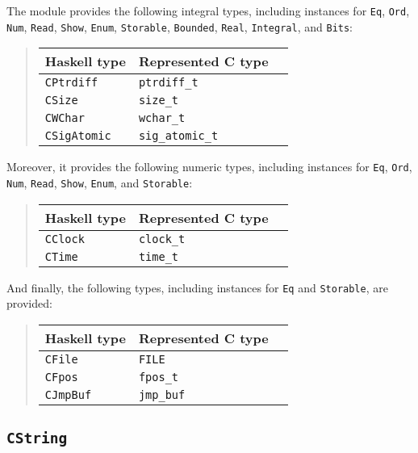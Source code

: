 \documentclass[a4paper,twoside]{article}
\newcommand{\code}[1]{\texttt{#1}}      %
\begin{document}
%
The module provides the following integral types, including instances for
\code{Eq}, \code{Ord}, \code{Num}, \code{Read}, \code{Show}, \code{Enum},
\code{Storable}, \code{Bounded}, \code{Real}, \code{Integral}, and
\code{Bits}:
%
\begin{quote}
  \begin{tabular}{|l|l|l|}
    \hline
    Haskell type     & Represented C type\\\hline\hline
    \code{CPtrdiff}  & \code{ptrdiff\_t}\\\hline
    \code{CSize}     & \code{size\_t}\\\hline
    \code{CWChar}    & \code{wchar\_t}\\\hline
    \code{CSigAtomic}& \code{sig\_atomic\_t}\\\hline
  \end{tabular}
\end{quote}
%
Moreover, it provides the following numeric types, including instances for
\code{Eq}, \code{Ord}, \code{Num}, \code{Read}, \code{Show}, \code{Enum}, and
\code{Storable}:
%
\begin{quote}
  \begin{tabular}{|l|l|l|}
    \hline
    Haskell type     & Represented C type\\\hline\hline
    \code{CClock}    & \code{clock\_t}\\\hline
    \code{CTime}     & \code{time\_t}\\\hline
  \end{tabular}
\end{quote}
%
And finally, the following types, including instances for \code{Eq} and
\code{Storable}, are provided:
%
\begin{quote}
  \begin{tabular}{|l|l|l|}
    \hline
    Haskell type     & Represented C type\\\hline\hline
    \code{CFile}     & \code{FILE}\\\hline
    \code{CFpos}     & \code{fpos\_t}\\\hline
    \code{CJmpBuf}   & \code{jmp\_buf}\\\hline
  \end{tabular}
\end{quote}

\subsection{\code{CString}}
\label{sec:CString}
\end{document}
